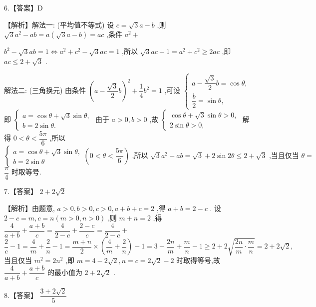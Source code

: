 \documentclass[10pt]{article}
\begin{document}
6.【答案】D

【解析】解法一: (平均值不等式) 设 $c = \sqrt{3}a - b$ ,则 $\sqrt{3}{a}^{2} - {ab} = a\left( {\sqrt{3}a - b}\right)  = {ac}$ ,条件 ${a}^{2} +$

${b}^{2} - \sqrt{3}{ab} = 1 \Leftrightarrow  {a}^{2} + {c}^{2} - \sqrt{3}{ac} = 1$ ,所以 $\sqrt{3}{ac} + 1 = {a}^{2} + {c}^{2} \geq  {2ac}$ ,即 ${ac} \leq  2 + \sqrt{3}$ .

解法二: (三角换元) 由条件 ${\left( a - \dfrac{\sqrt{3}}{2}b\right) }^{2} + \dfrac{1}{4}{b}^{2} = 1$ ,可设 $\left\{  \begin{array}{l} a - \dfrac{\sqrt{3}}{2}b = \cos \theta , \\  \dfrac{b}{2} = \sin \theta , \end{array}\right.$ 即 $\left\{  \begin{array}{l} a = \cos \theta  + \sqrt{3}\sin \theta , \\  b = 2\sin \theta . \end{array}\right.$ 由于 $a > 0,b > 0$ ,故 $\left\{  \begin{array}{l} \cos \theta  + \sqrt{3}\sin \theta  > 0, \\  2\sin \theta  > 0, \end{array}\right.$ 解得 $0 < \theta  < \dfrac{5\pi }{6}$ ,所以 $\left\{  {\begin{array}{l} a = \cos \theta  + \sqrt{3}\sin \theta , \\  b = 2\sin \theta  \end{array}\left( {0 < \theta  < \dfrac{5\pi }{6}}\right) \text{ ,所以 }\sqrt{3}{a}^{2} - {ab} = \sqrt{3} + 2\sin {2\theta } \leq  2 + \sqrt{3}\text{ ,当且仅当 }\theta  = }\right.$  $\dfrac{\pi }{4}$ 时取等号.

7.【答案】 $2 + 2\sqrt{2}$

【解析】由题意, $a > 0,b > 0,c > 0,a + b + c = 2$ ,得 $a + b = 2 - c$ . 设 $2 - c = m,c = n\left( {m > 0,n > 0}\right)$ ,则 $m + n = 2$ ,得 $\dfrac{4}{a + b} + \dfrac{a + b}{c} = \dfrac{4}{2 - c} + \dfrac{2 - c}{c} = \dfrac{4}{2 - c} +$  $\dfrac{2}{c} - 1 = \dfrac{4}{m} + \dfrac{2}{n} - 1 = \dfrac{m + n}{2} \times  \left( {\dfrac{4}{m} + \dfrac{2}{n}}\right)  - 1 = 3 + \dfrac{2n}{m} + \dfrac{m}{n} - 1 \geq  2 + 2\sqrt{\dfrac{2n}{m} \cdot  \dfrac{m}{n}} = 2 + 2\sqrt{2},$ 当且仅当 ${m}^{2} = 2{n}^{2}$ ,即 $m = 4 - 2\sqrt{2},n = c = 2\sqrt{2} - 2$ 时取得等号,故 $\dfrac{4}{a + b} + \dfrac{a + b}{c}$ 的最小值为 $2 + 2\sqrt{2}$ .

8.【答案】 $\dfrac{3 + 2\sqrt{2}}{5}$
\end{document}
